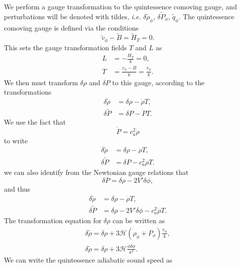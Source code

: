 \documentclass{article}
\begin{document}
We perform a gauge transformation to the quintessence comoving gauge, and perturbations will be denoted with tildes, \textit{i.e.} $\delta\tilde\rho_\phi$, $\delta \tilde P_\phi$, $\tilde q_\phi$. The quintessence comoving gauge is defined via the conditions
\begin{equation}
    \tilde v_\phi - \tilde B = \tilde H_T = 0.
\end{equation}
This sets the gauge transformation fields $T$ and $L$ as
\begin{align}
    L &= -\frac{H_T}{k} = 0, \\
    T &= \frac{v_\phi - B}{k} = \frac{v_\phi}{k}.
\end{align}
We then must transform $\delta \rho$ and $\delta P$ to this gauge, according to the transformations
\begin{align}
    \delta\tilde\rho &= \delta\rho - \dot\rho T, \\
    \delta\tilde P &= \delta P - \dot P T.
\end{align}
We use the fact that
\begin{equation}
    \dot P = c_a^2 \dot\rho
\end{equation}
to write
\begin{align}
    \delta\tilde\rho &= \delta\rho - \dot\rho T, \\
    \delta\tilde P &= \delta P - c_a^2\dot\rho T.
\end{align}
we can also identify from the Newtonian gauge relations that
\begin{equation}
    \delta P = \delta \rho - 2V'\delta\phi,
\end{equation}
and thus
\begin{align}
    \delta\tilde\rho &= \delta\rho - \dot\rho T, \\
    \delta\tilde P &= \delta \rho - 2V'\delta\phi - c_a^2\dot\rho T.
\end{align}
The transformation equation for $\delta\rho$ can be written as
\begin{align}
    \delta\tilde\rho = \delta \rho + 3\mathcal{H}(\rho_\phi + P_\phi)\frac{v_\phi}{k}, \\
    \delta\tilde\rho = \delta \rho + 3\mathcal{H}\frac{\dot\phi\delta\phi}{a^2}.
\end{align}
We can write the quintessence adiabatic sound speed as
\end{document}
